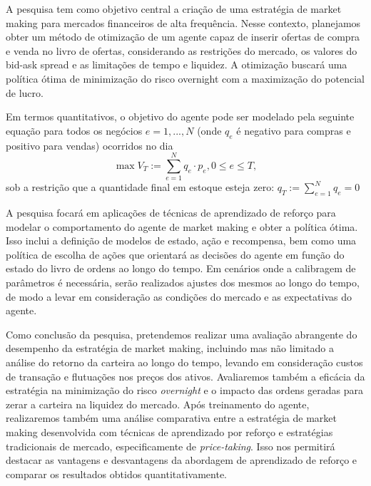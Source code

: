 A pesquisa tem como objetivo central a criação de uma estratégia de market making para mercados financeiros de alta frequência. Nesse contexto, planejamos obter um método de otimização de um agente capaz de inserir ofertas de compra e venda no livro de ofertas, considerando as restrições do mercado, os valores do bid-ask spread e as limitações de tempo e liquidez. A otimização buscará uma política ótima de minimização do risco overnight com a maximização do potencial de lucro.

Em termos quantitativos, o objetivo do agente pode ser modelado pela seguinte equação para todos os negócios $e=1,...,N$ (onde $q_e$ é negativo para compras e positivo para vendas) ocorridos no dia
\begin{equation*}
    \max V_T := \sum_{e=1}^N q_e \cdot p_e, 0 \le e \leq T, 
\end{equation*}
sob a restrição que a quantidade final em estoque esteja zero: $q_T:= \sum_{e=1}^N q_e = 0$

A pesquisa focará em aplicações de técnicas de aprendizado de reforço para modelar o comportamento do agente de market making e obter a política ótima. Isso inclui a definição de modelos de estado, ação e recompensa, bem como uma política de escolha de ações que orientará as decisões do agente em função do estado do livro de ordens ao longo do tempo. 
Em cenários onde a calibragem de parâmetros é necessária, serão realizados ajustes dos mesmos ao longo do tempo, de modo a levar em consideração as condições do mercado e as expectativas do agente.

Como conclusão da pesquisa, pretendemos realizar uma avaliação abrangente do desempenho da estratégia de market making, incluindo mas não limitado a análise do retorno da carteira ao longo do tempo, levando em consideração custos de transação e flutuações nos preços dos ativos. Avaliaremos também a eficácia da estratégia na minimização do risco \textit{overnight} e o impacto das ordens geradas para zerar a carteira na liquidez do mercado. Após treinamento do agente, realizaremos também uma análise comparativa entre a estratégia de market making desenvolvida com técnicas de aprendizado por reforço e estratégias tradicionais de mercado, especificamente de \textit{price-taking}. Isso nos permitirá destacar as vantagens e desvantagens da abordagem de aprendizado de reforço e comparar os resultados obtidos quantitativamente.
